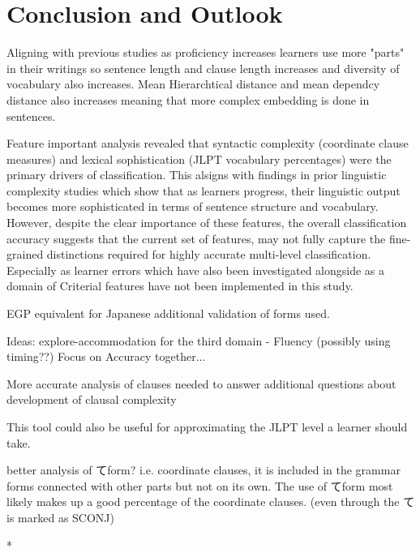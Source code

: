 \chapter{Conclusion and Outlook}


Aligning with previous studies as proficiency increases learners use more "parts" in their writings so sentence
length and clause length increases and diversity of vocabulary also increases. Mean Hierarchtical distance and mean
dependcy distance
also increases meaning
that more complex embedding is done in sentences.


Feature important analysis revealed that syntactic complexity (coordinate clause measures) and lexical
sophistication (JLPT vocabulary percentages) were the primary drivers of classification. This alsigns with findings
in prior linguistic complexity studies which show that as learners progress, their linguistic output becomes more
sophisticated in terms of sentence structure and vocabulary. However, despite the clear importance of these features,
the overall classification accuracy suggests that the current set of features, may not fully capture the
fine-grained distinctions required for highly accurate multi-level classification. Especially as learner errors
which have also been investigated alongside as a domain of Criterial features have not been implemented in this study.





EGP equivalent for Japanese additional validation of forms used.

Ideas: explore-accommodation for the third domain - Fluency (possibly using timing??)  Focus on Accuracy together...

More accurate analysis of clauses needed to answer additional questions about development of clausal complexity

This tool could also be useful for approximating the JLPT level a learner should take.

better analysis of てform? i.e. coordinate clauses, it is included in the grammar forms connected with other parts
but not on its own. The use of てform most likely makes up a good percentage of the coordinate clauses. (even through
the て is marked as SCONJ)


*